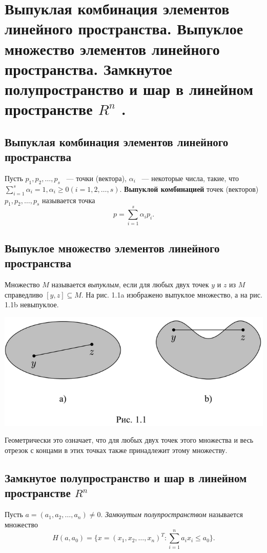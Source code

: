 \documentclass[../main.tex]{subfiles}
\begin{document}
\chapter{
	Выпуклая комбинация элементов линейного пространства. 
	Выпуклое множество элементов линейного пространства. 
	Замкнутое полупространство и шар в 
	линейном пространстве 
	$R^n$
	.}

\section{Выпуклая комбинация элементов линейного пространства}
Пусть $p_1, p_2, \dots,p_s$ ~--- точки (вектора), $\alpha_i$ ~---
некоторые числа, такие, что 
$\sum_{i=1}^{s}\alpha_i=1, \alpha_i\geq0 (i=1,2,\dots,s)$.
\textbf{Выпуклой комбинацией} 
точек (векторов) $p_1, p_2, \dots,p_s$ называется точка
\begin{equation}
	p=\sum_{i=1}^{s}\alpha_ip_i.
\end{equation}

\section{Выпуклое множество элементов линейного пространства}
Множество $M$ называется 
\emph{выпуклым}, если для любых двух точек $y$ и $z$ из $M$
справедливо $[y,z] \subseteq M$.
На рис. 1.1a изображено выпуклое множество, 
а на рис. 1.1b  невыпуклое.

\includegraphics[scale=0.3]{q1_1.png}

Геометрически это означает, что для любых двух точек этого
множества и весь отрезок с концами в этих точках также принадлежит
этому множеству.

\section{Замкнутое полупространство и шар в линейном пространстве 
$R^n$}
Пусть $a = (a_1,a_2,\dots,a_n) \neq 0$. \emph{Замкнутым полупространством} 
называется множество
\begin{equation}
	H(a,a_0)=\{x=(x_1,x_2,\dots,x_n)^T : \sum_{i=1}^{n}a_ix_i \leq a_0\}.
\end{equation} 
\end{document}
